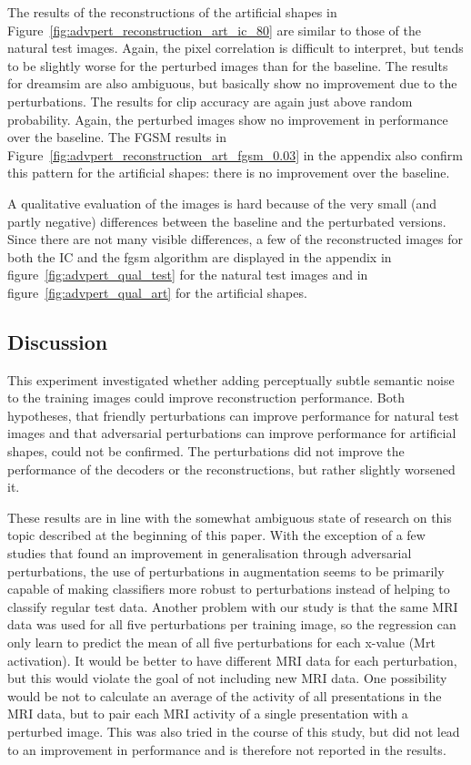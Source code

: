 The results of the reconstructions of the artificial shapes in Figure~\ref{fig:advpert_reconstruction_art_ic_80} are similar to those of the natural test images. Again, the pixel correlation is difficult to interpret, but tends to be slightly worse for the perturbed images than for the baseline. The results for dreamsim are also ambiguous, but basically show no improvement due to the perturbations. The results for clip accuracy are again just above random probability. Again, the perturbed images show no improvement in performance over the baseline. The FGSM results in Figure~\ref{fig:advpert_reconstruction_art_fgsm_0.03} in the appendix also confirm this pattern for the artificial shapes: there is no improvement over the baseline. 

A qualitative evaluation of the images is hard because of the very small (and partly negative) differences between the baseline and the perturbated versions. Since there are not many visible differences, a few of the reconstructed images for both the IC and the fgsm algorithm are displayed in the appendix in figure~\ref{fig:advpert_qual_test} for the natural test images and in figure~\ref{fig:advpert_qual_art} for the artificial shapes.


\subsection{Discussion}
This experiment investigated whether adding perceptually subtle semantic noise to the training images could improve reconstruction performance. Both hypotheses, that friendly perturbations can improve performance for natural test images and that adversarial perturbations can improve performance for artificial shapes, could not be confirmed. The perturbations did not improve the performance of the decoders or the reconstructions, but rather slightly worsened it. 

These results are in line with the somewhat ambiguous state of research on this topic described at the beginning of this paper. With the exception of a few studies that found an improvement in generalisation through adversarial perturbations\cite{xieAdversarialExamplesImprove2020,yanEnhancingClassificationPerformance2023}, the use of perturbations in augmentation seems to be primarily capable of making classifiers more robust to perturbations instead of helping to classify regular test data\cite{goodfellowExplainingHarnessingAdversarial2014,madryDeepLearningModels2019}. Another problem with our study is that the same MRI data was used for all five perturbations per training image, so the regression can only learn to predict the mean of all five perturbations for each x-value (Mrt activation). It would be better to have different MRI data for each perturbation, but this would violate the goal of not including new MRI data. One possibility would be not to calculate an average of the activity of all presentations in the MRI data, but to pair each MRI activity of a single presentation with a perturbed image. This was also tried in the course of this study, but did not lead to an improvement in performance and is therefore not reported in the results. 

